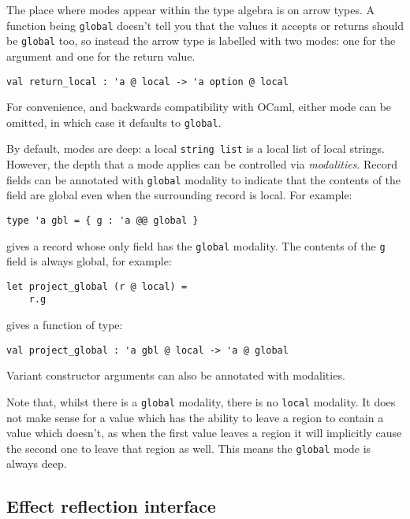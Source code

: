\documentclass[acmsmall, screen, nonacm]{acmart}
\theoremstyle{definition}
\begin{document}
The place where modes appear within the type algebra is on arrow
types. A function being \lstinline[style=oxcaml]{global} doesn't tell you
that the values it accepts or returns should be
\lstinline[style=oxcaml]{global} too, so instead the arrow type is
labelled with two modes: one for the argument and one for the return
value.
\begin{lstlisting}[style=oxcaml]
  val return_local : 'a @ local -> 'a option @ local
\end{lstlisting}
For convenience, and backwards compatibility with OCaml, either mode can
be omitted, in which case it defaults to
\lstinline[style=oxcaml]{global}.

By default, modes are deep: a local \lstinline[style=oxcaml]{string list}
is a local list of local strings. However, the depth that a mode applies
can be controlled via \emph{modalities}. Record fields can be annotated
with \lstinline[style=oxcaml]{global} modality to indicate that the
contents of the field are global even when the surrounding record is
local. For example:
\begin{lstlisting}[style=oxcaml]
  type 'a gbl = { g : 'a @@ global }
\end{lstlisting}
gives a record whose only field has the \lstinline[style=oxcaml]{global}
modality. The contents of the \lstinline[style=oxcaml]{g} field is always
global, for example:
\begin{lstlisting}[style=oxcaml]
  let project_global (r @ local) =
    r.g
\end{lstlisting}
gives a function of type:
\begin{lstlisting}[style=oxcaml]
  val project_global : 'a gbl @ local -> 'a @ global
\end{lstlisting}
Variant constructor arguments can also be annotated with modalities.

Note that, whilst there is a \lstinline[style=oxcaml]{global} modality,
there is no \lstinline[style=oxcaml]{local} modality. It does not make
sense for a value which has the ability to leave a region to contain a
value which doesn't, as when the first value leaves a region it will
implicitly cause the second one to leave that region as well. This means
the \lstinline[style=oxcaml]{global} mode is always deep.

\subsection{Effect reflection interface}
\label{sec:interface}
\end{document}
